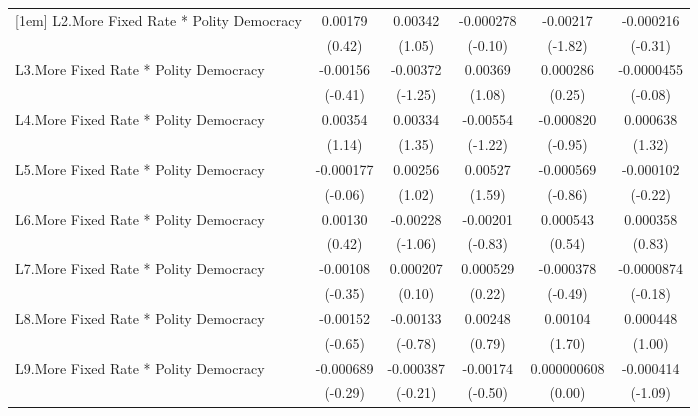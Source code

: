 {\begin{longtable}{l*{5}{c}}
[1em]
L2.More Fixed Rate * Polity Democracy&  0.00179         &  0.00342         &-0.000278         & -0.00217         &-0.000216         \\
                &   (0.42)         &   (1.05)         &  (-0.10)         &  (-1.82)         &  (-0.31)         \\
[1em]
L3.More Fixed Rate * Polity Democracy& -0.00156         & -0.00372         &  0.00369         & 0.000286         &-0.0000455         \\
                &  (-0.41)         &  (-1.25)         &   (1.08)         &   (0.25)         &  (-0.08)         \\
[1em]
L4.More Fixed Rate * Polity Democracy&  0.00354         &  0.00334         & -0.00554         &-0.000820         & 0.000638         \\
                &   (1.14)         &   (1.35)         &  (-1.22)         &  (-0.95)         &   (1.32)         \\
[1em]
L5.More Fixed Rate * Polity Democracy&-0.000177         &  0.00256         &  0.00527         &-0.000569         &-0.000102         \\
                &  (-0.06)         &   (1.02)         &   (1.59)         &  (-0.86)         &  (-0.22)         \\
[1em]
L6.More Fixed Rate * Polity Democracy&  0.00130         & -0.00228         & -0.00201         & 0.000543         & 0.000358         \\
                &   (0.42)         &  (-1.06)         &  (-0.83)         &   (0.54)         &   (0.83)         \\
[1em]
L7.More Fixed Rate * Polity Democracy& -0.00108         & 0.000207         & 0.000529         &-0.000378         &-0.0000874         \\
                &  (-0.35)         &   (0.10)         &   (0.22)         &  (-0.49)         &  (-0.18)         \\
[1em]
L8.More Fixed Rate * Polity Democracy& -0.00152         & -0.00133         &  0.00248         &  0.00104         & 0.000448         \\
                &  (-0.65)         &  (-0.78)         &   (0.79)         &   (1.70)         &   (1.00)         \\
[1em]
L9.More Fixed Rate * Polity Democracy&-0.000689         &-0.000387         & -0.00174         &0.000000608         &-0.000414         \\
                &  (-0.29)         &  (-0.21)         &  (-0.50)         &   (0.00)         &  (-1.09)         \\

\end{longtable}}
